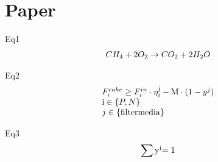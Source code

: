 \documentclass[10pt,a4paper]{article}
\begin{document}
%

\section{Paper}
Eq1
\begin{align}
	C{H_4} + {\rm{ }}2{O_2} \to C{O_2} + 2{H_2}O
\end{align}

Eq2
\begin{align}
	\begin{array}{l}F_i^{cake} \ge F_i^{in} \cdot \eta _i^{\rm{j}} - {\rm{M}} \cdot (1 - {y^j}){\rm{     }}\\{\rm{i}} \in \left\{ {P,N} \right\}{\rm{   }}\\j \in \left\{ {{\rm{filter media}}} \right\}\end{array}
\end{align}

Eq3
\begin{align}
	\sum {{{\rm{y}}^{\rm{j}}}} {\rm{ = 1}}
\end{align}
\end{document}
